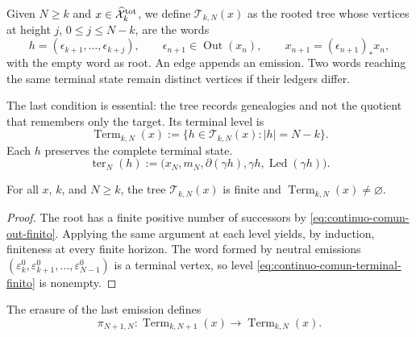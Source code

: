 \begin{definition}
\label{def:continuo-comun-arbol-finito}
Given \(N\geq k\) and
\(x\in\widehat{\mathcal X}^{\rm tot}_k\), we define
\(\mathscr T_{k,N}(x)\) as the rooted tree whose vertices at height
\(j\), \(0\leq j\leq N-k\), are the words
\begin{equation}
\label{eq:continuo-comun-vertice-arbol}
 h=(\epsilon_{k+1},\ldots,\epsilon_{k+j}),
 \qquad
 \epsilon_{n+1}\in\operatorname{Out}(x_n),
 \qquad
 x_{n+1}=(\epsilon_{n+1})_*x_n,
\end{equation}
with the empty word as root. An edge appends an emission. Two
words reaching the same terminal state remain distinct vertices
if their ledgers differ.
\end{definition}

The last condition is essential: the tree records genealogies and not the
quotient that remembers only the target.  Its terminal level is
\begin{equation}
\label{eq:continuo-comun-terminal-finito}
 \operatorname{Term}_{k,N}(x)
 :=\{h\in\mathscr T_{k,N}(x):|h|=N-k\}.
\end{equation}
Each \(h\) preserves the complete terminal state.
\begin{equation}
\label{eq:continuo-comun-registro-terminal}
 \operatorname{ter}_{N}(h)
 :=\bigl(x_N,m_N,\partial(\gamma h),
          \gamma h,\operatorname{Led}(\gamma h)\bigr).
\end{equation}

\begin{proposition}
\label{prop:continuo-comun-arbol-finito-no-vacio}
For all \(x\), \(k\), and \(N\geq k\), the tree
\(\mathscr T_{k,N}(x)\) is finite and
\(\operatorname{Term}_{k,N}(x)\neq\varnothing\).
\end{proposition}

\begin{proof}
The root has a finite positive number of successors by
\eqref{eq:continuo-comun-out-finito}.  Applying the same argument at each
level yields, by induction, finiteness at every finite horizon.  The word
formed by neutral emissions
\((\varepsilon^0_k,\varepsilon^0_{k+1},\ldots,
\varepsilon^0_{N-1})\) is a terminal vertex, so
level \eqref{eq:continuo-comun-terminal-finito} is nonempty.
\end{proof}

The erasure of the last emission defines
\begin{equation}
\label{eq:continuo-comun-proyeccion-terminal}
 \pi_{N+1,N}:\operatorname{Term}_{k,N+1}(x)
 \longrightarrow\operatorname{Term}_{k,N}(x).
\end{equation}

